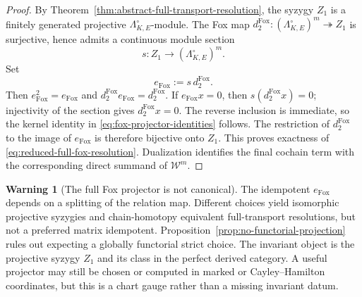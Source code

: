 \documentclass[11pt]{article}
\theoremstyle{definition}
\newtheorem{warning}[theorem]{Warning}
\begin{document}
\begin{proof}
By Theorem~\ref{thm:abstract-full-transport-resolution}, the syzygy $Z_1$ is a
finitely generated projective $\Lambda_{K,E}^{\circ}$-module.  The Fox map
$d_2^{\mathrm{Fox}}:(\Lambda_{K,E}^{\circ})^m\twoheadrightarrow Z_1$ is
surjective, hence admits a continuous module section
\[
 s:Z_1\longrightarrow(\Lambda_{K,E}^{\circ})^m.
\]
Set
\[
 e_{\mathrm{Fox}}:=s\,d_2^{\mathrm{Fox}}.
\]
Then $e_{\mathrm{Fox}}^2=e_{\mathrm{Fox}}$ and
$d_2^{\mathrm{Fox}}e_{\mathrm{Fox}}=d_2^{\mathrm{Fox}}$.  If
$e_{\mathrm{Fox}}x=0$, then $s(d_2^{\mathrm{Fox}}x)=0$; injectivity of the
section gives $d_2^{\mathrm{Fox}}x=0$.  The reverse inclusion is immediate,
so the kernel identity in \eqref{eq:fox-projector-identities} follows.  The
restriction of $d_2^{\mathrm{Fox}}$ to the image of $e_{\mathrm{Fox}}$ is
therefore bijective onto $Z_1$.  This proves exactness of
\eqref{eq:reduced-full-fox-resolution}.  Dualization identifies the final
cochain term with the corresponding direct summand of $\mathcal W^m$.
\end{proof}

\begin{warning}[The full Fox projector is not canonical]\label{warn:fox-projector-noncanonical}
The idempotent $e_{\mathrm{Fox}}$ depends on a splitting of the relation map.
Different choices yield isomorphic projective syzygies and chain-homotopy
equivalent full-transport resolutions, but not a preferred matrix idempotent.
Proposition~\ref{prop:no-functorial-projection} rules out expecting a globally functorial strict choice.  The invariant object is the projective syzygy $Z_1$ and its class in the perfect derived category.  A useful projector may still be chosen or computed in marked or Cayley--Hamilton coordinates, but this is a chart gauge rather than a missing invariant datum.
\end{warning}
\end{document}
